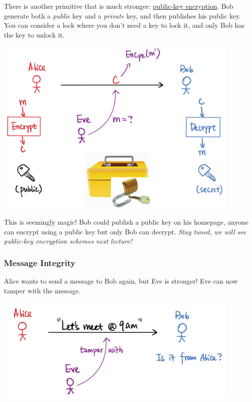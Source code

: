 \begin{definition}
    There is another primitive that is much stronger: \ul{public-key encryption}. Bob generate both a \emph{public} key and a \emph{private} key, and then publishes his public key. You can consider a lock where you don't need a key to lock it, and only Bob has the key to unlock it.

    \begin{center}
        \includegraphics[width=0.9\textwidth]{images/2023-01-26/public_key.png}
    \end{center}

    This is seemingly magic! Bob could publish a public key on his homepage, anyone can encrypt using a public key but only Bob can decrypt. \emph{Stay tuned, we will see public-key encryption schemes next lecture!}
\end{definition}

\subsubsection{Message Integrity}
Alice wants to send a message to Bob again, but Eve is stronger! Eve can now tamper with the message.

\begin{center}
    \includegraphics[width=0.9\textwidth]{images/2023-01-26/integrity.png}
\end{center}

